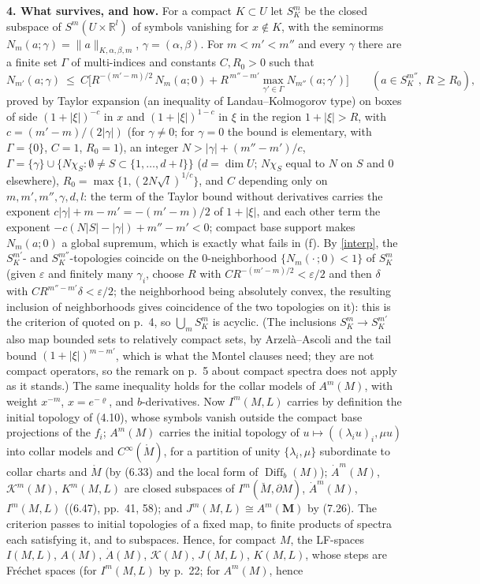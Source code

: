 \documentclass[11pt]{article}
\newcommand{\R}{\mathbb{R}}
\newcommand{\Diff}{\operatorname{Diff}}
\newcommand{\Mo}{\mathring{M}}
\newcommand{\Mb}{\breve{M}}
\begin{document}
\medskip\noindent\textbf{4. What survives, and how.}
For a compact $K\subset U$ let $S^m_K$ be the closed subspace of $S^m(U\times\R^l)$ of symbols vanishing for $x\notin K$, with the seminorms $N_m(a;\gamma)=\|a\|_{K,\alpha,\beta,m}$, $\gamma=(\alpha,\beta)$. For $m<m'<m''$ and every $\gamma$ there are a finite set $\Gamma$ of multi-indices and constants $C,R_0>0$ such that
\begin{equation}\label{interp}
N_{m'}(a;\gamma)\ \le\ C\Big[R^{-(m'-m)/2}\,N_m(a;0)+R^{\,m''-m'}\max_{\gamma'\in\Gamma}N_{m''}(a;\gamma')\Big]\qquad(a\in S^{m''}_K,\ R\ge R_0),
\end{equation}
proved by Taylor expansion (an inequality of Landau--Kolmogorov type) on boxes of side $(1+|\xi|)^{-c}$ in $x$ and $(1+|\xi|)^{1-c}$ in $\xi$ in the region $1+|\xi|>R$, with $c=(m'-m)/(2|\gamma|)$ (for $\gamma\ne0$; for $\gamma=0$ the bound is elementary, with $\Gamma=\{0\}$, $C=1$, $R_0=1$), an integer $N>|\gamma|+(m''-m')/c$, $\Gamma=\{\gamma\}\cup\{N\chi_S:\emptyset\ne S\subset\{1,\dots,d+l\}\}$ ($d=\dim U$; $N\chi_S$ equal to $N$ on $S$ and $0$ elsewhere), $R_0=\max\{1,(2N\sqrt l)^{1/c}\}$, and $C$ depending only on $m,m',m'',\gamma,d,l$: the term of the Taylor bound without derivatives carries the exponent $c|\gamma|+m-m'=-(m'-m)/2$ of $1+|\xi|$, and each other term the exponent $-c(N|S|-|\gamma|)+m''-m'<0$; compact base support makes $N_m(a;0)$ a global supremum, which is exactly what fails in (f). By \eqref{interp}, the $S^{m'}_K$- and $S^{m''}_K$-topologies coincide on the $0$-neighborhood $\{N_m(\cdot\,;0)<1\}$ of $S^m_K$ (given $\varepsilon$ and finitely many $\gamma_i$, choose $R$ with $CR^{-(m'-m)/2}<\varepsilon/2$ and then $\delta$ with $CR^{m''-m'}\delta<\varepsilon/2$; the neighborhood being absolutely convex, the resulting inclusion of neighborhoods gives coincidence of the two topologies on it): this is the criterion of \cite[Thm.~6.1]{Wen03} quoted on p.~4, so $\bigcup_mS^m_K$ is acyclic. (The inclusions $S^m_K\to S^{m'}_K$ also map bounded sets to relatively compact sets, by Arzel\`a--Ascoli and the tail bound $(1+|\xi|)^{m-m'}$, which is what the Montel clauses need; they are not compact operators, so the remark on p.~5 about compact spectra does not apply as it stands.) The same inequality holds for the collar models of $A^m(M)$, with weight $x^{-m}$, $x=e^{-\varrho}$, and $b$-derivatives. Now $I^m(M,L)$ carries by definition the initial topology of (4.10), whose symbols vanish outside the compact base projections of the $f_i$; $A^m(M)$ carries the initial topology of $u\mapsto((\lambda_iu)_i,\mu u)$ into collar models and $C^\infty(\Mo)$, for a partition of unity $\{\lambda_i,\mu\}$ subordinate to collar charts and $\Mo$ (by (6.33) and the local form of $\Diff_b(M)$); $\dot A^m(M)$, $\mathcal K^m(M)$, $K^m(M,L)$ are closed subspaces of $I^m(\Mb,\partial M)$, $\dot A^m(M)$, $I^m(M,L)$ ((6.47), pp.~41, 58); and $J^m(M,L)\cong A^m(\boldsymbol M)$ by (7.26). The criterion passes to initial topologies of a fixed map, to finite products of spectra each satisfying it, and to subspaces. Hence, for compact $M$, the LF-spaces $I(M,L)$, $A(M)$, $\dot A(M)$, $\mathcal K(M)$, $J(M,L)$, $K(M,L)$, whose steps are Fr\'echet spaces (for $I^m(M,L)$ by p.~22; for $A^m(M)$, hence 
\end{document}
